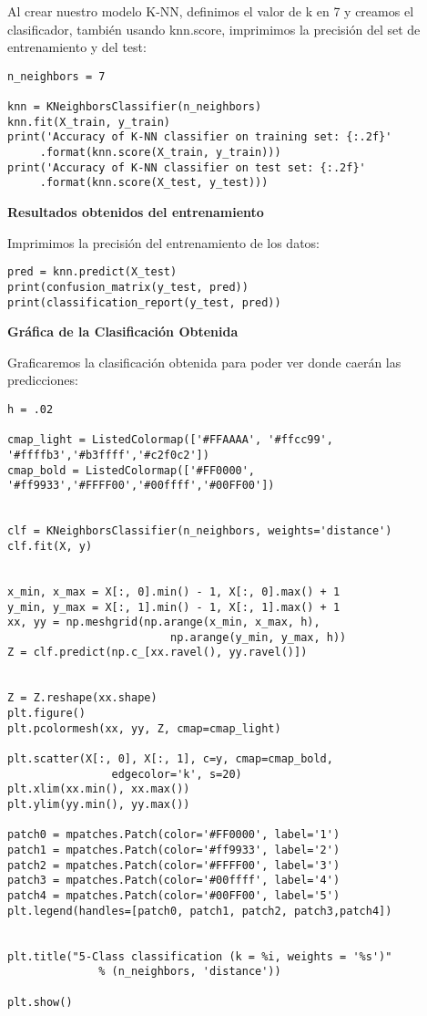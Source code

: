 \documentclass{article}
\begin{document}
Al crear nuestro modelo K-NN, definimos el valor de k en 7 y creamos el clasificador, también usando knn.score, imprimimos la precisión del set de entrenamiento y del test:

\begin{lstlisting}
n_neighbors = 7

knn = KNeighborsClassifier(n_neighbors)
knn.fit(X_train, y_train)
print('Accuracy of K-NN classifier on training set: {:.2f}'
     .format(knn.score(X_train, y_train)))
print('Accuracy of K-NN classifier on test set: {:.2f}'
     .format(knn.score(X_test, y_test)))
\end{lstlisting}

\textbf{Resultados obtenidos del entrenamiento}




Imprimimos la precisión del entrenamiento de los datos:
\begin{lstlisting}
pred = knn.predict(X_test)
print(confusion_matrix(y_test, pred))
print(classification_report(y_test, pred))
\end{lstlisting}





\textbf{Gráfica de la Clasificación Obtenida}



Graficaremos la clasificación obtenida para poder ver donde caerán las predicciones:

\begin{lstlisting}
h = .02  

cmap_light = ListedColormap(['#FFAAAA', '#ffcc99', '#ffffb3','#b3ffff','#c2f0c2'])
cmap_bold = ListedColormap(['#FF0000', '#ff9933','#FFFF00','#00ffff','#00FF00'])


clf = KNeighborsClassifier(n_neighbors, weights='distance')
clf.fit(X, y)


x_min, x_max = X[:, 0].min() - 1, X[:, 0].max() + 1
y_min, y_max = X[:, 1].min() - 1, X[:, 1].max() + 1
xx, yy = np.meshgrid(np.arange(x_min, x_max, h),
                         np.arange(y_min, y_max, h))
Z = clf.predict(np.c_[xx.ravel(), yy.ravel()])


Z = Z.reshape(xx.shape)
plt.figure()
plt.pcolormesh(xx, yy, Z, cmap=cmap_light)

plt.scatter(X[:, 0], X[:, 1], c=y, cmap=cmap_bold,
                edgecolor='k', s=20)
plt.xlim(xx.min(), xx.max())
plt.ylim(yy.min(), yy.max())
    
patch0 = mpatches.Patch(color='#FF0000', label='1')
patch1 = mpatches.Patch(color='#ff9933', label='2')
patch2 = mpatches.Patch(color='#FFFF00', label='3')
patch3 = mpatches.Patch(color='#00ffff', label='4')
patch4 = mpatches.Patch(color='#00FF00', label='5')
plt.legend(handles=[patch0, patch1, patch2, patch3,patch4])

    
plt.title("5-Class classification (k = %i, weights = '%s')"
              % (n_neighbors, 'distance'))

plt.show()
\end{lstlisting}
\end{document}
